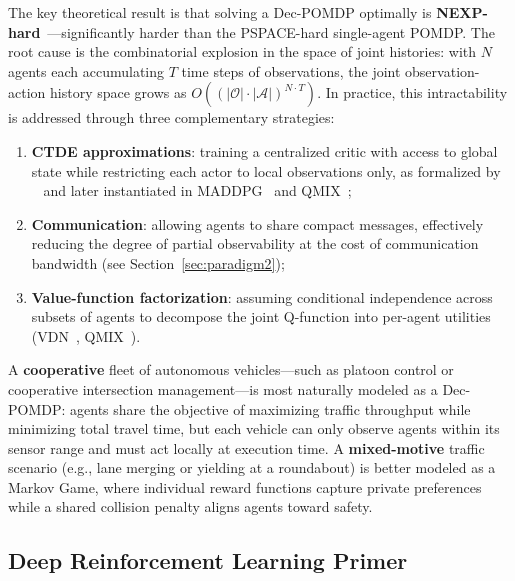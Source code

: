 \documentclass[12pt, a4paper]{article}
\begin{document}
The key theoretical result is that solving a Dec-POMDP optimally is
\textbf{NEXP-hard}~\cite{bernstein2002complexity}---significantly harder than
the PSPACE-hard single-agent POMDP.  The root cause is the combinatorial
explosion in the space of joint histories: with $N$ agents each accumulating
$T$ time steps of observations, the joint observation-action history space
grows as $O\!\left((|\mathcal{O}|\cdot|\mathcal{A}|)^{N \cdot T}\right)$.
In practice, this intractability is addressed through three complementary
strategies:
\begin{enumerate}[noitemsep]
  \item \textbf{CTDE approximations}: training a centralized critic with
        access to global state while restricting each actor to local
        observations only, as formalized by
        \citeauthor{kraemer2016multi}~\cite{kraemer2016multi} and later
        instantiated in MADDPG~\cite{lowe2017multi} and QMIX~\cite{rashid2018qmix};
  \item \textbf{Communication}: allowing agents to share compact messages,
        effectively reducing the degree of partial observability at the cost
        of communication bandwidth (see Section~\ref{sec:paradigm2});
  \item \textbf{Value-function factorization}: assuming conditional
        independence across subsets of agents to decompose the joint
        Q-function into per-agent utilities
        (VDN~\cite{sunehag2018value}, QMIX~\cite{rashid2018qmix}).
\end{enumerate}

A \textbf{cooperative} fleet of autonomous vehicles---such as platoon control
or cooperative intersection management---is most naturally modeled as a
Dec-POMDP: agents share the objective of maximizing traffic throughput while
minimizing total travel time, but each vehicle can only observe agents within
its sensor range and must act locally at execution time.  A
\textbf{mixed-motive} traffic scenario (e.g., lane merging or yielding at a
roundabout) is better modeled as a Markov Game, where individual reward
functions capture private preferences while a shared collision penalty aligns
agents toward safety.

\subsection{Deep Reinforcement Learning Primer}
\label{sec:drl_primer}
\end{document}
